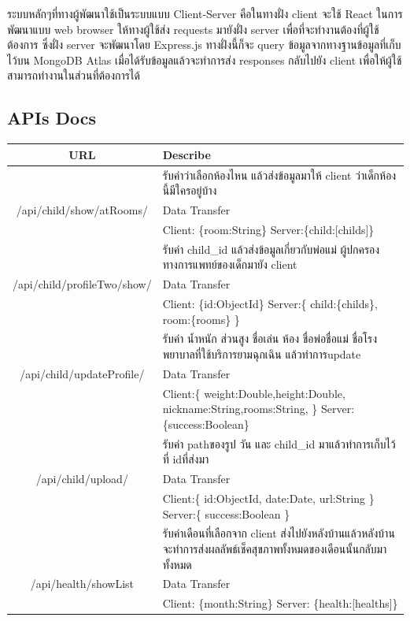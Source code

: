 ระบบหลักๆที่ทางผู้พัฒนาใช้เป็นระบบแบบ Client-Server คือในทางฝั่ง client จะใช้ React ในการพัฒนาแบบ web browser ให้ทางผู้ใช้ส่ง requests มายังฝั่ง server เพื่อที่จะทำงานต้องที่ผู้ใช้ต้องการ ซึ่งฝั่ง server 
จะพัฒนาโดย Express.js ทางฝั่งนี้ก็จะ query ข้อมูลจากทางฐานข้อมูลที่เก็บไว้บน MongoDB Atlas เมื่อได้รับข้อมูลแล้วจะทำการส่ง responses กลับไปยัง client เพื่อให้ผู้ใช้สามารถทำงานในส่วนที่ต้องการได้
\subsection{APIs Docs}
\begin{landscape}
  \begin{tabularx}{\linewidth}{|c|X|}
  \hline
  URL & Describe \\

  \hline
  \endhead
  & รับค่าว่าเลือกห้องไหน แล้วส่งข้อมูลมาให้ client ว่าเด็กห้องนี้มีใครอยู่บ้าง
  \\ {/api/child/show/atRooms/} & Data Transfer
  \\ &Client: \{room:String\}
     Server:\{child:[childs]\}
  \\
  \hline
  &รับค่า child\_id แล้วส่งข้อมูลเกี่ยวกับพ่อแม่ ผู้ปกครอง ทางการแพทย์ของเด็กมายัง client
  \\ {/api/child/profileTwo/show/}&Data Transfer
  \\ &Client: \{id:ObjectId\}
  Server:\{ 
    child:\{childs\}, room:\{rooms\}
  \}
  \\
  \hline
  & รับค่า น้ำหนัก ส่วนสูง ชื่อเล่น ห้อง ชื่อพ่อชื่อแม่ ชื่อโรงพยาบาลที่ใช้บริการยามฉุกเฉิน
  แล้วทำการupdate  
  \\ {/api/child/updateProfile/} & Data Transfer 
  \\ &Client:\{
    weight:Double,height:Double,
    nickname:String,rooms:String,
    \}
  Server:\{success:Boolean\}
    \\
  \hline
  & รับค่า pathของรูป วัน และ child\_id มาแล้วทำการเก็บไว้ที่ idที่ส่งมา
  \\ {/api/child/upload/}&Data Transfer
  \\ &Client:\{
    id:ObjectId,
    date:Date,
    url:String
   \}
  Server:\{
    success:Boolean
   \} \\
   
  \hline
  & รับค่าเดือนที่เลือกจาก client ส่งไปยังหลังบ้านแล้วหลังบ้านจะทำการส่งผลลัพธ์เช็คสุขภาพทั้งหมดของเดือนนั้นกลับมาทั้งหมด
  \\
  {/api/health/showList}& Data Transfer
  \\ &Client: \{month:String\}
  Server: \{health:[healths]\}
  \\ 
  \hline


\end{tabularx}
\end{landscape}
